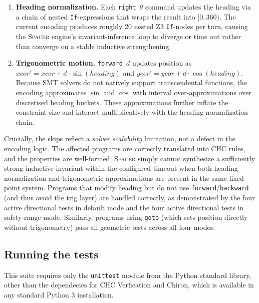 \begin{enumerate}[leftmargin=1.5em]
    \item \textbf{Heading normalization.}
    Each \texttt{right}~$\theta$ command updates the heading via a chain of
    nested \texttt{If}-expressions that wraps the result into $[0,360)$.
    The current encoding produces roughly 20 nested Z3 \texttt{If}-nodes per
    turn, causing the \textsc{Spacer} engine's invariant-inference loop to
    diverge or time out rather than converge on a stable inductive
    strengthening.

    \item \textbf{Trigonometric motion.}
    \texttt{forward}~$d$ updates position as
    $\mathit{xcor}' = \mathit{xcor} + d\cdot\sin(\mathit{heading})$ and
    $\mathit{ycor}' = \mathit{ycor} + d\cdot\cos(\mathit{heading})$.
    Because SMT solvers do not natively support transcendental functions, the
    encoding approximates $\sin$ and $\cos$ with interval
    over-approximations over discretised heading buckets.  These
    approximations further inflate the constraint size and interact
    multiplicatively with the heading-normalization chain.
\end{enumerate}

\noindent
Crucially, the skips reflect a \emph{solver scalability} limitation, not a
defect in the encoding logic.  The affected programs are correctly translated
into CHC rules, and the properties are well-formed; \textsc{Spacer} simply
cannot synthesize a sufficiently strong inductive invariant within the
configured timeout when both heading normalization and trigonometric
approximations are present in the same fixed-point system.  Programs that
modify heading but do not use \texttt{forward}/\texttt{backward} (and thus
avoid the trig layer) are handled correctly, as demonstrated by the four
active directional tests in default mode and the four active directional
tests in safety-range mode.  Similarly, programs using \texttt{goto} (which
sets position directly without trigonometry) pass all geometric tests across
all four modes.

\subsection*{Running the tests}

This suite requires only the \texttt{unittest} module from the Python standard library, other than the dependecies for CHC Verfication and Chiron, which is available in any standard Python 3 installation.

